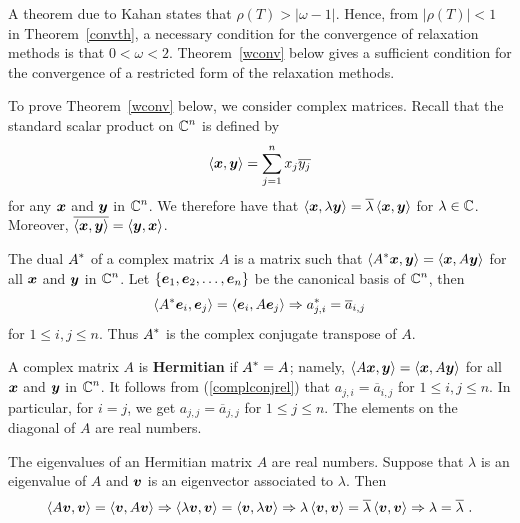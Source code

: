 A theorem due to Kahan states that $\rho(T) > |\omega -1|$.
Hence, from $|\rho(T)| < 1$ in Theorem~\ref{convth}, a necessary
condition for the convergence of relaxation methods is that
$0 < \omega < 2$.  Theorem~\ref{wconv} below gives a sufficient condition
for the convergence of a restricted form of the relaxation methods.

To prove Theorem~\ref{wconv} below, we consider complex matrices.
Recall that the standard scalar product on $\displaystyle \mathbb{C}^n$ is defined by
\[
\left\langle{\bm{x}} , {\bm{y}}\right\rangle = \sum_{j=1}^n x_j \overline{y_j}
\]
for any $\bm{x}$ and $\bm{y}$ in $\displaystyle \mathbb{C}^n$.  We
therefore have that
$\left\langle{\bm{x}} , {\lambda \bm{y}}\right\rangle = \overline{\lambda} \left\langle{\bm{x}} , {\bm{y}}\right\rangle$ 
for $\lambda\in \mathbb{C}$.  Moreover,
$\overline{\left\langle{\bm{x}} , {\bm{y}}\right\rangle} = \left\langle{\bm{y}} , {\bm{x}}\right\rangle$.

The dual $\displaystyle A^\ast$ of a \nn complex matrix $A$ is a \nn
matrix such that
$\displaystyle \left\langle{A^\ast\bm{x}} , {\bm{y}}\right\rangle = \left\langle{\bm{x}} , {A\bm{y}}\right\rangle$
for all $\bm{x}$ and $\bm{y}$ in $\displaystyle \mathbb{C}^n$.
Let $\{\bm{e}_1, \bm{e}_2, \ldots, \bm{e}_n\}$ be the canonical basis
of $\displaystyle \mathbb{C}^n$, then
\begin{equation}\label{complconjrel}
\left\langle{A^\ast\bm{e}_i} , {\bm{e}_j}\right\rangle = \left\langle{\bm{e}_i} , {A\bm{e}_j}\right\rangle
\Rightarrow  a^\ast_{j,i} = \overline{a}_{i,j}
\end{equation}
for $1\leq i,j \leq n$.  Thus $\displaystyle A^\ast$ is the complex conjugate
transpose of $A$.

A \nn complex matrix $A$ is
{\bfseries Hermitian} if
$\displaystyle A^\ast = A$; namely,
$\left\langle{A\bm{x}} , {\bm{y}}\right\rangle = \left\langle{\bm{x}} , {A\bm{y}}\right\rangle$ for all $\bm{x}$ and
$\bm{y}$ in $\displaystyle \mathbb{C}^n$.  It follows from (\ref{complconjrel}) that
$a_{j,i} = \overline{a}_{i,j}$ for $1\leq i,j \leq n$.  In particular, 
for $i=j$, we get $a_{j,j} = \overline{a}_{j,j}$ for $1\leq j \leq n$.
The elements on the diagonal of $A$ are real numbers.

The eigenvalues of an Hermitian matrix $A$ are real numbers.  Suppose that
$\lambda$ is an eigenvalue of $A$ and $\bm{v}$ is an eigenvector
associated to $\lambda$.  Then
\begin{equation}\label{complconjrelEigen}
\left\langle{A\bm{v}} , {\bm{v}}\right\rangle = \left\langle{\bm{v}} , {A\bm{v}}\right\rangle
\Rightarrow \left\langle{\lambda\bm{v}} , {\bm{v}}\right\rangle = \left\langle{\bm{v}} , {\lambda\bm{v}}\right\rangle
\Rightarrow \lambda \left\langle{\bm{v}} , {\bm{v}}\right\rangle
= \overline{\lambda} \left\langle{\bm{v}} , {\bm{v}}\right\rangle
\Rightarrow  \lambda = \overline{\lambda} \ .
\end{equation}

